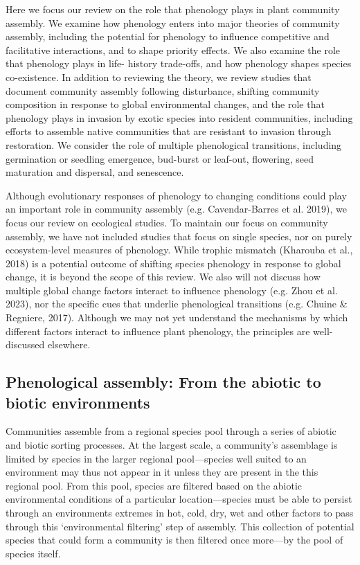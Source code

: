 \documentclass[11pt]{article}
\begin{document}
Here we focus our review on the role that phenology plays in plant community assembly. We examine how phenology enters into major theories of community assembly, including the potential for phenology to influence competitive and facilitative interactions, and to shape priority effects. We also examine the role that phenology plays in life- history trade-offs, and how phenology shapes species co-existence. In addition to reviewing the theory, we review studies that document community assembly following disturbance, shifting community composition in response to global environmental changes, and the role that phenology plays in invasion by exotic species into resident communities, including efforts to assemble native communities that are resistant to invasion through restoration. We consider the role of multiple phenological transitions, including germination or seedling emergence, bud-burst or leaf-out, flowering, seed maturation and dispersal, and senescence.

Although evolutionary responses of phenology to changing conditions could play an important role in community assembly (e.g. Cavendar-Barres et al. 2019), we focus our review on ecological studies. To maintain our focus on community assembly, we have not included studies that focus on single species, nor on purely ecosystem-level measures of phenology. While trophic mismatch (Kharouba et al., 2018) is a potential outcome of shifting species phenology in response to global change, it is beyond the scope of this review. We also will not discuss how multiple global change factors interact to influence phenology (e.g. Zhou et al. 2023), nor the specific cues that underlie phenological transitions (e.g. Chuine \& Regniere, 2017). Although we may not yet understand the mechanisms by which different factors interact to influence plant phenology, the principles are well-discussed elsewhere.

\subsection*{Phenological assembly: From the abiotic to biotic environments}
Communities assemble from a regional species pool through a series of abiotic and biotic sorting processes. At the largest scale, a community's assemblage is limited by species in the larger regional pool---species well suited to an environment may thus not appear in it unless they are present in the this regional pool. From this pool, species are filtered based on the abiotic environmental conditions of a particular location---species must be able to persist through an environments extremes in hot, cold, dry, wet and other factors to pass through this `environmental filtering' step of assembly. This collection of potential species that could form a community is then filtered once more---by the pool of species itself. 
\end{document}
